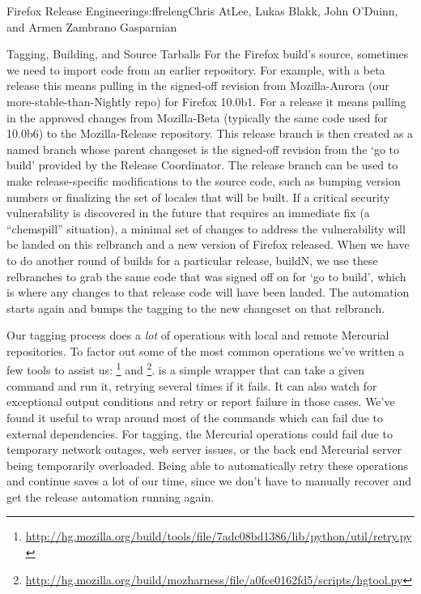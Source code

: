 \begin{aosachapter}{Firefox Release Engineering}{s:ffreleng}{Chris AtLee, Lukas Blakk, John O'Duinn, and Armen Zambrano Gasparnian}
\begin{aosasect1}{Tagging, Building, and Source Tarballs}
For the Firefox build's source, sometimes we need to import code
from an earlier repository. For example, with a beta release this means
pulling in the signed-off revision from Mozilla-Aurora (our
more-stable-than-Nightly repo) for Firefox 10.0b1. For a release it
means pulling in the approved changes from Mozilla-Beta (typically the
same code used for 10.0b6) to the Mozilla-Release repository.  This release
branch is then created as a named branch whose parent changeset is
the signed-off revision from the `go to build' provided by the Release
Coordinator. The release branch can be used to make release-specific
modifications to the source code, such as bumping version numbers or
finalizing the set of locales that will be built. If a critical
security vulnerability is discovered in the future that requires an
immediate fix (a ``chemspill'' situation), a minimal set of changes to
address the vulnerability will be landed on this relbranch and a new
version of Firefox released. When we have to do another round of
builds for a particular release, buildN, we use these relbranches to
grab the same code that was signed off on for `go to build', which is
where any changes to that release code will have been landed. The
automation starts again and bumps the tagging to the new changeset on
that relbranch.
    
Our tagging process does a \emph{lot} of operations with local and
remote Mercurial repositories. To factor out some of the most
common operations we've written a few tools to assist us:
\footnote{\url{http://hg.mozilla.org/build/tools/file/7adc08bd1386/lib/python/util/retry.py}}
and
\footnote{\url{http://hg.mozilla.org/build/mozharness/file/a0fce0162fd5/scripts/hgtool.py}}.
 is a simple wrapper that can take a given command and
run it, retrying several times if it fails. It can also watch for
exceptional output conditions and retry or report failure in those
cases. We've found it useful to wrap  around most of the
commands which can fail due to external dependencies.  For tagging,
the Mercurial operations could fail due to temporary network outages, web
server issues, or the back end Mercurial server being temporarily
overloaded. Being able to automatically retry these operations and
continue saves a lot of our time, since we don't have to manually
recover and get the release automation running again.
    

\end{aosasect1}
\end{aosachapter}
